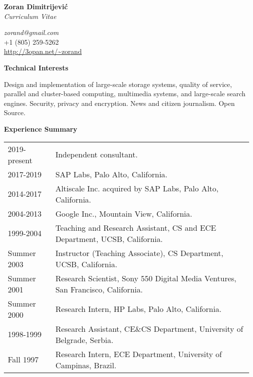 \documentclass[10pt]{article}
\renewcommand{\section}[1]{ \vspace{10pt}\begin{flushleft}{\hspace{-0.2in }\Large\bf
    #1}\end{flushleft}\nopagebreak }
\begin{document}
\begin{center}
\vspace{-1.5in}
  {\Large\bf Zoran Dimitrijević}\\
  {\large\em Curriculum Vitae}
\end{center}

\begin{center}
{\em zorand@gmail.com}\\
+1 (805) 259-5262\\
\url{http://3opan.net/~zorand}
\end{center}

%

\vspace{-5pt}
\section{Technical Interests}
Design and implementation of large-scale storage systems, quality of service, 
parallel and cluster-based computing, multimedia systems, and large-scale 
search engines. Security, privacy and encryption. News and citizen journalism. 
Open Source.

\section{Experience Summary}

\begin{tabular}{ll}
2019-present    & Independent consultant.\\
2017-2019       & SAP Labs, Palo Alto, California.\\
2014-2017       & Altiscale Inc. acquired by SAP Labs, Palo Alto, California.\\
2004-2013       & Google Inc., Mountain View, California.\\
1999-2004	& Teaching and Research Assistant, 
			CS and ECE Department, UCSB, California. \\
Summer 2003	& Instructor (Teaching Associate), CS Department, UCSB, California. \\
Summer 2001	& Research Scientist, Sony 550 Digital Media Ventures, 
			San Francisco, California. \\
Summer 2000	& Research Intern, HP Labs, Palo Alto, California. \\
1998-1999	& Research Assistant, CE\&CS Department, University of Belgrade, Serbia.\\
Fall 1997	& Research Intern, ECE Department, University of Campinas, Brazil. \\
\end{tabular}
\end{document}
